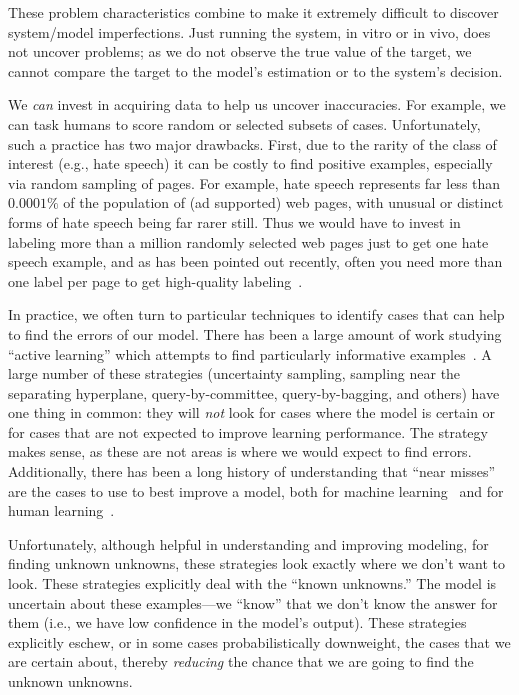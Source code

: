 These problem characteristics combine to make it extremely difficult to
discover system/model imperfections.  Just running the system, in
vitro or in vivo, does not uncover problems; as we do not observe
the true value of the target, we cannot compare the target to the model's
estimation or to the system's decision.

We \textit{can} invest in acquiring data to help us uncover inaccuracies.  For example, we can task humans to score random or selected subsets of cases.  Unfortunately, such a practice has two major drawbacks.  First, due to the rarity of the class of interest (e.g., hate speech) it can be costly to find positive examples, especially via random sampling of pages.  For example, hate speech represents far less than $0.0001\%$ of the population of (ad supported) web pages, with unusual or distinct forms of hate speech being far rarer still. Thus we would have to invest in labeling more than a million randomly selected web pages just to get one hate speech example, and as has been pointed out recently, often you need more than one label per page to get high-quality labeling~\cite{shengKDD2008,raykar2009supervised}.




In practice, we often turn to particular techniques to identify
cases that can help to find the errors of our model.  There has been a
large amount of work studying ``active learning'' which attempts to
find particularly informative examples~\cite{SettlesActiveLearning,activelearningtutorial}.
A large number of these strategies (uncertainty sampling, sampling
near the separating hyperplane, query-by-committee, query-by-bagging,
and others) have one thing in common: they will \emph{not} look for cases where
the model is certain or for cases that are not expected to improve learning performance.
The strategy makes sense, as these are not areas is where we would expect to find
errors.  Additionally, there has been a long history of understanding that
``near misses'' are the cases to use to best improve a model, both for
machine learning~\cite{winston1970learning} and for human
learning~\cite{vanlehn1998analogy}.

Unfortunately, although helpful in understanding and improving
modeling, for finding unknown unknowns, 
these strategies look exactly where we don't want to look.
These strategies explicitly deal with the ``known unknowns.''  The
model is uncertain about these examples---we ``know'' that we don't
know the answer for them (i.e., we have low confidence in the model's
output).  These strategies explicitly eschew, or in some cases
probabilistically downweight, the cases that we are
certain about, thereby \textit{reducing} the chance that we are going
to find the unknown unknowns.

